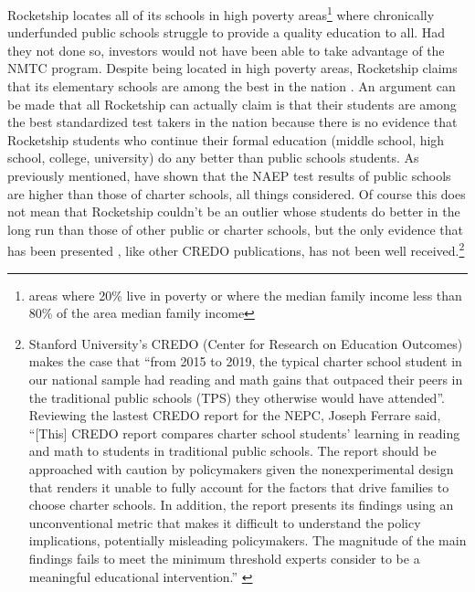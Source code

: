 Rocketship locates all of its schools in high poverty areas\footnote{areas where 20\% live in poverty or where the median family income less than 80\% of the area median family income\parencite[13-14]{CDFI2020}} where chronically underfunded public schools struggle to provide a quality education to all. Had they not done so, investors would not have been able to take advantage of the NMTC program. Despite being located in high poverty areas, Rocketship claims that its elementary schools are among the best in the nation \parencite{Abousalem2021}. An argument can be made that all Rocketship can actually claim is that their students are among the best standardized test takers in the nation because there is no evidence that Rocketship students who continue their formal education (middle school, high school, college, university) do any better than public schools students. As previously mentioned, \textcite{Lubienski.Lubienski2014} have shown that the NAEP test results of public schools are higher than those of charter schools, all things considered. Of course this does not mean that Rocketship couldn't be an outlier whose students do better in the long run than those of other public or charter schools, but the only evidence that has been presented \parencite{Raymond.etal2023}, like other CREDO publications, has not been well received.\footnote{Stanford University's CREDO (Center for Research on Education Outcomes) makes the case that ``from 2015 to 2019, the typical charter school student in our national sample had reading and math gains that outpaced their peers in the traditional public schools (TPS) they otherwise would have attended''. Reviewing the lastest CREDO report for the NEPC, Joseph Ferrare said, ``[This] CREDO report compares charter school students’ learning in reading and math to students in traditional public schools. The report should be approached with caution by policymakers given the nonexperimental design that renders it unable to fully account for the factors that drive families to choose charter schools. In addition, the report presents its findings using an unconventional metric that makes it difficult to understand the policy implications, potentially misleading policymakers. The magnitude of the main findings fails to meet the minimum threshold experts consider to be a meaningful educational intervention.'' \parencite{Ferrare2023}}

